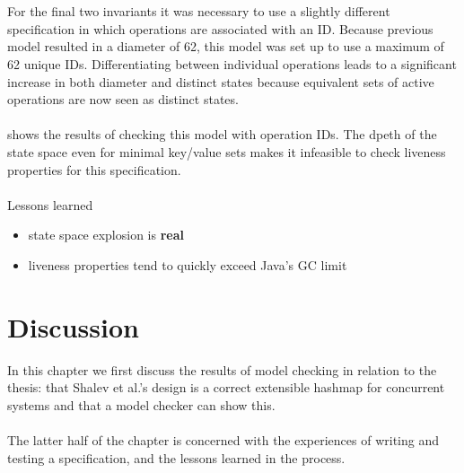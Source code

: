 \documentclass{uit-thesis}
\begin{document}
\begin{table}
    \centering
    \caption{Model checking SOConcurrent with operation IDs}
    \label{tab:SOConcurrent_ID}
\end{table}
\\\\
For the final two invariants it was necessary to use a slightly different specification in which operations are associated with an ID. Because previous model resulted in a diameter of 62, this model was set up to use a maximum of 62 unique IDs. Differentiating between individual operations leads to a significant increase in both diameter and distinct states because equivalent sets of active operations are now seen as distinct states.
\\\\
 shows the results of checking this model with operation IDs. The dpeth of the state space even for minimal key/value sets makes it infeasible to check liveness properties for this specification.
\\\\
Lessons learned
\begin{itemize}
    \item state space explosion is \textbf{real}
    \item liveness properties tend to quickly exceed Java's GC limit
\end{itemize}

\chapter{Discussion}\label{ch:discussion}
In this chapter we first discuss the results of model checking in relation to the thesis: that Shalev et al.'s design is a correct extensible hashmap for concurrent systems and that a model checker can show this.
\\\\
The latter half of the chapter is concerned with the experiences of writing and testing a specification, and the lessons learned in the process.
\end{document}
